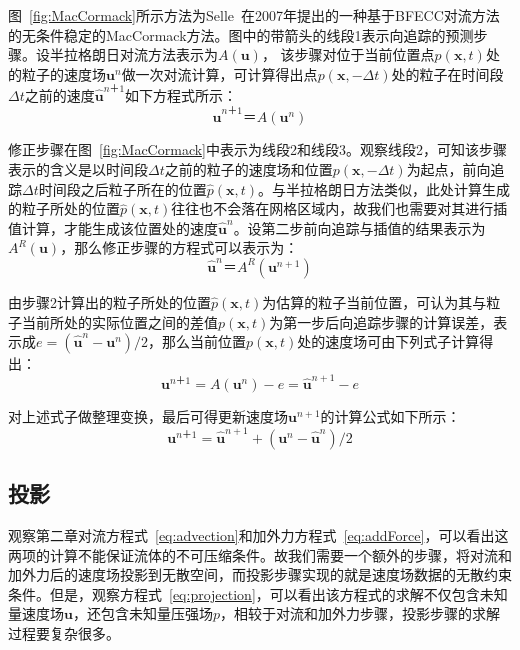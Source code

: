图~\ref{fig:MacCormack}所示方法为Selle~\cite{selle2008unconditionally}在2007年提出的一种基于BFECC对流方法的无条件稳定的MacCormack方法。图中的带箭头的线段1表示向追踪的预测步骤。设半拉格朗日对流方法表示为$A(\boldsymbol u)$，
该步骤对位于当前位置点$p(\boldsymbol x,t)$处的粒子的速度场$\boldsymbol u^n$做一次对流计算，可计算得出点$p(\boldsymbol x, -\Delta t)$处的粒子在时间段$\Delta t$之前的速度$\boldsymbol {\hat u}^{n ＋ 1}$如下方程式所示：
\begin{equation}
\boldsymbol {\hat u}^{n ＋ 1}  ＝ A(\boldsymbol u^n)
\end{equation}

修正步骤在图~\ref{fig:MacCormack}中表示为线段2和线段3。观察线段2，可知该步骤表示的含义是以时间段$\Delta t$之前的粒子的速度场和位置$p(\boldsymbol x, -\Delta t)$为起点，前向追踪$\Delta t$时间段之后粒子所在的位置$\hat p(\boldsymbol x,t)$。与半拉格朗日方法类似，此处计算生成的粒子所处的位置$\hat p(\boldsymbol x,t)$往往也不会落在网格区域内，故我们也需要对其进行插值计算，才能生成该位置处的速度$\hat {\boldsymbol u}^n$。设第二步前向追踪与插值的结果表示为$A^R(\boldsymbol u)$，那么修正步骤的方程式可以表示为：
\begin{equation}
\boldsymbol {\hat u}^{n}  ＝ A^R(\boldsymbol u^{n + 1})
\end{equation}

由步骤2计算出的粒子所处的位置$\hat p(\boldsymbol x,t)$为估算的粒子当前位置，可认为其与粒子当前所处的实际位置之间的差值$p(\boldsymbol x,t)$为第一步后向追踪步骤的计算误差，表示成$e = (\hat {\boldsymbol u}^n - \boldsymbol u^n) / 2$，那么当前位置$p(\boldsymbol x,t)$处的速度场可由下列式子计算得出：
\begin{equation}
\boldsymbol {u}^{n ＋ 1}  = A(\boldsymbol u^n) - e = \hat {\boldsymbol u}^{n + 1} - e
\end{equation}

对上述式子做整理变换，最后可得更新速度场$\boldsymbol u^{n + 1}$的计算公式如下所示：
\begin{equation}
\label{eq:MacCormack}
\boldsymbol {u}^{n ＋ 1}  = \hat {\boldsymbol u}^{n + 1} + (\boldsymbol u^n - \hat {\boldsymbol u}^n) / 2
\end{equation}

\subsection {投影}

观察第二章对流方程式~\ref{eq:advection}和加外力方程式~\ref{eq:addForce}，可以看出这两项的计算不能保证流体的不可压缩条件。故我们需要一个额外的步骤，将对流和加外力后的速度场投影到无散空间，而投影步骤实现的就是速度场数据的无散约束条件。但是，观察方程式~\ref{eq:projection}，可以看出该方程式的求解不仅包含未知量速度场$\boldsymbol u$，还包含未知量压强场$p$，相较于对流和加外力步骤，投影步骤的求解过程要复杂很多。

